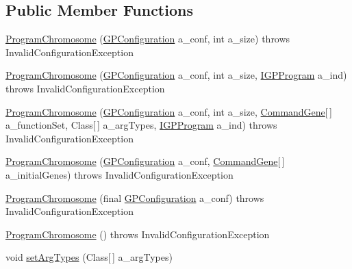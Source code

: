 \subsection*{Public Member Functions}
\begin{DoxyCompactItemize}
\item 
\hyperlink{classorg_1_1jgap_1_1gp_1_1impl_1_1_program_chromosome_aefbb2bea6ceab1a79c6bd444962b5400}{Program\-Chromosome} (\hyperlink{classorg_1_1jgap_1_1gp_1_1impl_1_1_g_p_configuration}{G\-P\-Configuration} a\-\_\-conf, int a\-\_\-size)  throws Invalid\-Configuration\-Exception 
\item 
\hyperlink{classorg_1_1jgap_1_1gp_1_1impl_1_1_program_chromosome_ad014d2d525e7210edd3fa35146432f67}{Program\-Chromosome} (\hyperlink{classorg_1_1jgap_1_1gp_1_1impl_1_1_g_p_configuration}{G\-P\-Configuration} a\-\_\-conf, int a\-\_\-size, \hyperlink{interfaceorg_1_1jgap_1_1gp_1_1_i_g_p_program}{I\-G\-P\-Program} a\-\_\-ind)  throws Invalid\-Configuration\-Exception 
\item 
\hyperlink{classorg_1_1jgap_1_1gp_1_1impl_1_1_program_chromosome_a6895103538a0e05c6693fd2f6711b50f}{Program\-Chromosome} (\hyperlink{classorg_1_1jgap_1_1gp_1_1impl_1_1_g_p_configuration}{G\-P\-Configuration} a\-\_\-conf, int a\-\_\-size, \hyperlink{classorg_1_1jgap_1_1gp_1_1_command_gene}{Command\-Gene}\mbox{[}$\,$\mbox{]} a\-\_\-function\-Set, Class\mbox{[}$\,$\mbox{]} a\-\_\-arg\-Types, \hyperlink{interfaceorg_1_1jgap_1_1gp_1_1_i_g_p_program}{I\-G\-P\-Program} a\-\_\-ind)  throws Invalid\-Configuration\-Exception 
\item 
\hyperlink{classorg_1_1jgap_1_1gp_1_1impl_1_1_program_chromosome_ac4ca2284886dd13bfe27e4802a40d5fd}{Program\-Chromosome} (\hyperlink{classorg_1_1jgap_1_1gp_1_1impl_1_1_g_p_configuration}{G\-P\-Configuration} a\-\_\-conf, \hyperlink{classorg_1_1jgap_1_1gp_1_1_command_gene}{Command\-Gene}\mbox{[}$\,$\mbox{]} a\-\_\-initial\-Genes)  throws Invalid\-Configuration\-Exception 
\item 
\hyperlink{classorg_1_1jgap_1_1gp_1_1impl_1_1_program_chromosome_aafd1f551ada36c7835737f0e3daeead4}{Program\-Chromosome} (final \hyperlink{classorg_1_1jgap_1_1gp_1_1impl_1_1_g_p_configuration}{G\-P\-Configuration} a\-\_\-conf)  throws Invalid\-Configuration\-Exception 
\item 
\hyperlink{classorg_1_1jgap_1_1gp_1_1impl_1_1_program_chromosome_a49e32c4ee7a42b4e7fbddae454b325c2}{Program\-Chromosome} ()  throws Invalid\-Configuration\-Exception 
\item 
void \hyperlink{classorg_1_1jgap_1_1gp_1_1impl_1_1_program_chromosome_a714709ffa46266e370becc723467c8bb}{set\-Arg\-Types} (Class\mbox{[}$\,$\mbox{]} a\-\_\-arg\-Types)

\end{DoxyCompactItemize}
